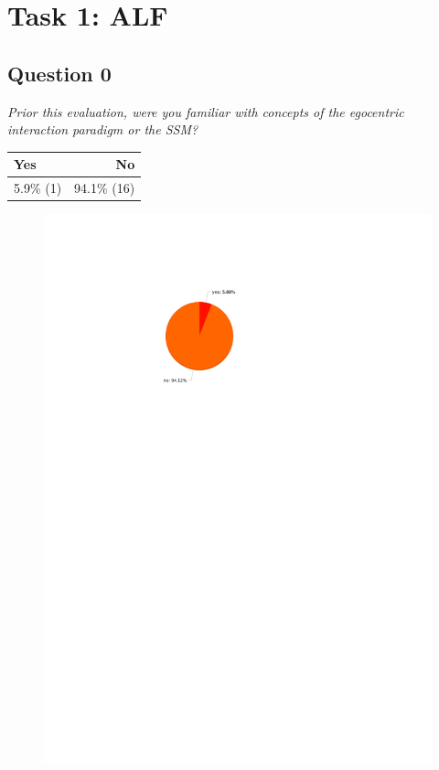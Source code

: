 \section{Task 1: ALF} %
\label{sec:res_alf_task}

\subsection{Question 0}\label{question1:0}
\emph{Prior this evaluation, were you familiar with concepts of the egocentric interaction paradigm or the SSM?}
\begin{table}[H]
	\begin{center}
		\small \begin{tabular*}{0.35\columnwidth}{lr}
			\\ \hline \hline
			Yes & No \\ \hline \hline

		 	5.9\% (1) & 94.1\% (16)\\ \hline
		\end{tabular*}
	\end{center}
\end{table}

\begin{figure}[H]
	\centering
	\includegraphics[width=0.6\linewidth]{gfx/Chapter_EvaluationResults/ALFTask/question0}
\end{figure}

